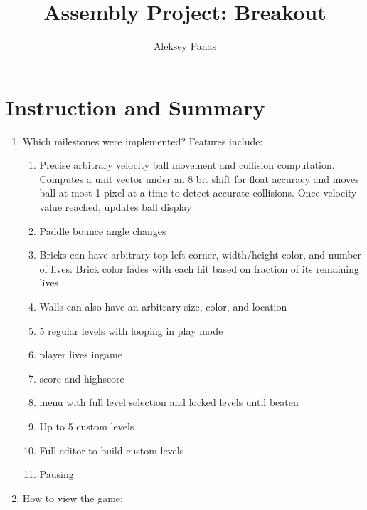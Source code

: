 \documentclass{article}
\title{Assembly Project: Breakout}
\author{Aleksey Panas}
\begin{document}
\maketitle

\section{Instruction and Summary}

\begin{enumerate}

    \item Which milestones were implemented? \newline \newline
    Features include:
    \begin{enumerate}
  
    \item Precise arbitrary velocity ball movement and collision computation. Computes a unit vector under an 8 bit shift for float accuracy and moves ball at most 1-pixel at a time to detect accurate collisions. Once velocity value reached, updates ball display
    \item Paddle bounce angle changes
    \item Bricks can have arbitrary top left corner,  width/height color, and number of lives. Brick color fades with each hit based on fraction of its remaining lives
    \item Walls can also have an arbitrary size, color, and location
    \item 5 regular levels with looping in play mode
    \item player lives ingame
    \item score and highscore
    \item menu with full level selection and locked levels until beaten
    \item Up to 5 custom levels
    \item Full editor to build custom levels
    \item Pausing
    
    \end{enumerate}

    \item How to view the game:
    

\end{enumerate}
\end{document}

